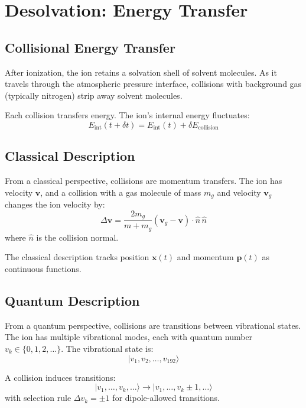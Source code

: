 \documentclass[12pt,a4paper]{article}
\theoremstyle{remark}
\begin{document}
\section{Desolvation: Energy Transfer}
\label{sec:desolvation}

\subsection{Collisional Energy Transfer}

After ionization, the ion retains a solvation shell of solvent molecules. As it travels through the atmospheric pressure interface, collisions with background gas (typically nitrogen) strip away solvent molecules.

Each collision transfers energy. The ion's internal energy fluctuates:
\begin{equation}
E_{\text{int}}(t + \delta t) = E_{\text{int}}(t) + \delta E_{\text{collision}}
\end{equation}

\subsection{Classical Description}

From a classical perspective, collisions are momentum transfers. The ion has velocity $\mathbf{v}$, and a collision with a gas molecule of mass $m_g$ and velocity $\mathbf{v}_g$ changes the ion velocity by:
\begin{equation}
\Delta \mathbf{v} = \frac{2m_g}{m + m_g}(\mathbf{v}_g - \mathbf{v}) \cdot \hat{n} \, \hat{n}
\end{equation}
where $\hat{n}$ is the collision normal.

The classical description tracks position $\mathbf{x}(t)$ and momentum $\mathbf{p}(t)$ as continuous functions.

\subsection{Quantum Description}

From a quantum perspective, collisions are transitions between vibrational states. The ion has multiple vibrational modes, each with quantum number $v_k \in \{0, 1, 2, \ldots\}$. The vibrational state is:
\begin{equation}
|v_1, v_2, \ldots, v_{192}\rangle
\end{equation}

A collision induces transitions:
\begin{equation}
|v_1, \ldots, v_k, \ldots\rangle \to |v_1, \ldots, v_k \pm 1, \ldots\rangle
\end{equation}
with selection rule $\Delta v_k = \pm 1$ for dipole-allowed transitions.
\end{document}
